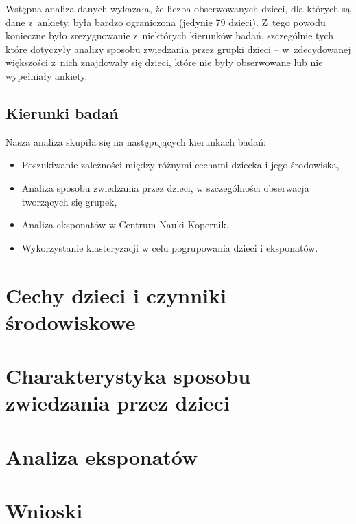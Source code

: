 \documentclass[conference]{IEEEtran}
\begin{document}
Wstępna analiza danych wykazała, że liczba obserwowanych dzieci, dla których są dane z~ankiety, była bardzo ograniczona (jedynie 79 dzieci). Z~tego powodu konieczne było zrezygnowanie z~niektórych kierunków badań, szczególnie tych, które dotyczyły analizy sposobu zwiedzania przez grupki dzieci -- w~zdecydowanej większości z~nich znajdowały się dzieci, które nie były obserwowane lub nie wypełniały ankiety.
\subsection{Kierunki badań}
Nasza analiza skupiła się na następujących kierunkach badań:
\begin{itemize}
\item Poszukiwanie zależności między różnymi cechami dziecka i jego środowiska,
\item Analiza sposobu zwiedzania przez dzieci, w szczególności obserwacja tworzących się grupek,
\item Analiza eksponatów w Centrum Nauki Kopernik,
\item Wykorzystanie klasteryzacji w celu pogrupowania dzieci i eksponatów.
\end{itemize}

\section{Cechy dzieci i czynniki środowiskowe}

\section{Charakterystyka sposobu zwiedzania przez dzieci}

\section{Analiza eksponatów}

\section{Wnioski}
\end{document}
